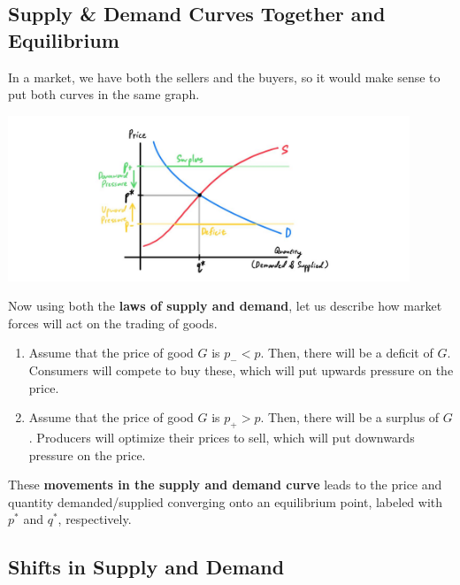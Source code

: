\documentclass{article}
\begin{document}
  \subsection{Supply \& Demand Curves Together and Equilibrium}

    In a market, we have both the sellers and the buyers, so it would make sense to put both curves in the same graph.
    \begin{center}
      \includegraphics[width=0.9\textwidth]{img/Supply_and_Demand.jpg}
    \end{center}
    Now using both the \textbf{laws of supply and demand}, let us describe how market forces will act on the trading of goods.
    \begin{enumerate}
      \item Assume that the price of good $G$ is $p_{-} < p$. Then, there will be a deficit of $G$. Consumers will compete to buy these, which will put upwards pressure on the price.
      \item Assume that the price of good $G$ is $p_{+} > p$. Then, there will be a surplus of $G$. Producers will optimize their prices to sell, which will put downwards pressure on the price.
    \end{enumerate}
    These \textbf{movements in the supply and demand curve} leads to the price and quantity demanded/supplied converging onto an equilibrium point, labeled with $p^\ast$ and $q^\ast$, respectively.

  \subsection{Shifts in Supply and Demand}
\end{document}
